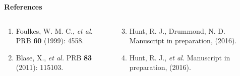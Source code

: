 \documentclass[hyperref={draft}, table, xcdraw]{beamer}
\begin{document}
\begin{frame}[fragile]
\begin{center}
\hfill
\begin{minipage}{0.976\textwidth}
\begin{block}{{\bf\large References}}
\begin{columns}[T]


\begin{column}{.48\textwidth}
\begin{enumerate}
\item Foulkes, W. M. C., {\it et al.} PRB {\bf 60} (1999): 4558.
\item Blase, X., {\it et al.} PRB {\bf 83} (2011): 115103.
\end{enumerate}
\end{column}
\hfill
\begin{column}{.48\textwidth}
\begin{enumerate}
\setcounter{enumi}{2}
\item Hunt, R. J., Drummond, N. D. Manuscript in preparation, (2016).
\item Hunt, R. J., {\it et al.} Manuscript in preparation, (2016).
\end{enumerate}
\end{column}
\end{columns}
\end{block}
\end{minipage}
\end{center}

\end{frame}
\end{document}
